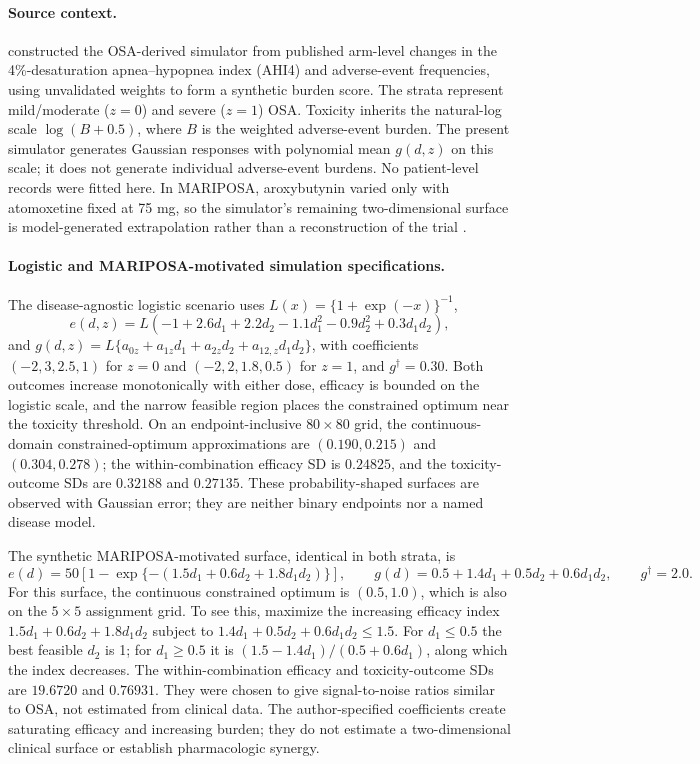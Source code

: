\documentclass[11pt]{article}
\newcommand{\rev}[1]{{#1}}
\begin{document}
\paragraph{Source context.} \citet{willardobd} constructed the OSA-derived simulator from published arm-level changes in the 4\%-desaturation apnea--hypopnea index (AHI4) and adverse-event frequencies, using unvalidated weights to form a synthetic burden score. \rev{The strata represent mild/moderate ($z=0$) and severe ($z=1$) OSA. Toxicity inherits the natural-log scale $\log(B+0.5)$, where $B$ is the weighted adverse-event burden. The present simulator generates Gaussian responses with polynomial mean $g(d,z)$ on this scale; it does not generate individual adverse-event burdens.} No patient-level records were fitted here. In MARIPOSA, aroxybutynin varied only with atomoxetine fixed at 75 mg, so the simulator's remaining two-dimensional surface is model-generated extrapolation rather than a reconstruction of the trial \citep{schweitzer2023}.

\paragraph{Logistic and MARIPOSA-motivated simulation specifications.} The disease-agnostic logistic scenario uses \rev{$L(x)=\{1+\exp(-x)\}^{-1}$},
\[
 e(d,z)=L(-1+2.6d_1+2.2d_2-1.1d_1^2-0.9d_2^2+0.3d_1d_2),
\]
and $g(d,z)=L\{a_{0z}+a_{1z}d_1+a_{2z}d_2+a_{12,z}d_1d_2\}$, with coefficients $(-2,3,2.5,1)$ for $z=0$ and $(-2,2,1.8,0.5)$ for $z=1$, and $g^\dagger=0.30$. Both outcomes increase monotonically with either dose, efficacy is bounded on the logistic scale, and the narrow feasible region places the constrained optimum near the toxicity threshold. On an endpoint-inclusive $80\times80$ grid, the continuous-domain constrained-optimum approximations are $(0.190,0.215)$ and $(0.304,0.278)$; the within-combination efficacy SD is $0.24825$, and the toxicity-outcome SDs are $0.32188$ and $0.27135$. These probability-shaped surfaces are observed with Gaussian error; they are neither binary endpoints nor a named disease model.

The synthetic MARIPOSA-motivated surface, identical in both strata, is
\[
 e(d)=50[1-\exp\{-(1.5d_1+0.6d_2+1.8d_1d_2)\}],\qquad
 g(d)=0.5+1.4d_1+0.5d_2+0.6d_1d_2,\qquad g^\dagger=2.0.
\]
For this surface, the continuous constrained optimum is $(0.5,1.0)$, which is also on the $5\times5$ assignment grid. To see this, maximize the increasing efficacy index $1.5d_1+0.6d_2+1.8d_1d_2$ subject to $1.4d_1+0.5d_2+0.6d_1d_2\le1.5$. For $d_1\le0.5$ the best feasible $d_2$ is 1; for $d_1\ge0.5$ it is $(1.5-1.4d_1)/(0.5+0.6d_1)$, along which the index decreases. The within-combination efficacy and toxicity-outcome SDs are $19.6720$ and $0.76931$. They were chosen to give signal-to-noise ratios similar to OSA, not estimated from clinical data. The author-specified coefficients create saturating efficacy and increasing burden; they do not estimate a two-dimensional clinical surface or establish pharmacologic synergy.
\end{document}
